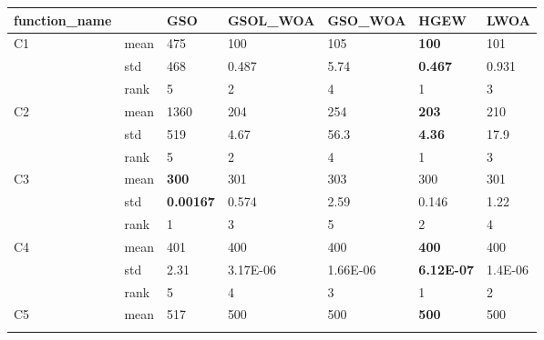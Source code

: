 \begin{table}[]
\centering
\begin{tabular}{|l|l|l|l|l|l|l|}
\hline
function\_name       &      & GSO              & GSOL\_WOA         & GSO\_WOA          & HGEW              & LWOA              \\ \hline
\multirow{3}{*}{C1}  & mean & 475              & 100               & 105               & \textbf{100}      & 101               \\ \cline{2-7} 
                     & std  & 468              & 0.487             & 5.74              & \textbf{0.467}    & 0.931             \\ \cline{2-7} 
                     & rank & 5                & 2                 & 4                 & 1                 & 3                 \\ \hline
\multirow{3}{*}{C2}  & mean & 1360             & 204               & 254               & \textbf{203}      & 210               \\ \cline{2-7} 
                     & std  & 519              & 4.67              & 56.3              & \textbf{4.36}     & 17.9              \\ \cline{2-7} 
                     & rank & 5                & 2                 & 4                 & 1                 & 3                 \\ \hline
\multirow{3}{*}{C3}  & mean & \textbf{300}     & 301               & 303               & 300               & 301               \\ \cline{2-7} 
                     & std  & \textbf{0.00167} & 0.574             & 2.59              & 0.146             & 1.22              \\ \cline{2-7} 
                     & rank & 1                & 3                 & 5                 & 2                 & 4                 \\ \hline
\multirow{3}{*}{C4}  & mean & 401              & 400               & 400               & \textbf{400}      & 400               \\ \cline{2-7} 
                     & std  & 2.31             & 3.17E-06          & 1.66E-06          & \textbf{6.12E-07} & 1.4E-06           \\ \cline{2-7} 
                     & rank & 5                & 4                 & 3                 & 1                 & 2                 \\ \hline
\multirow{3}{*}{C5}  & mean & 517              & 500               & 500               & \textbf{500}      & 500               \\ \cline{2-7} 

\end{tabular}
\end{table}

